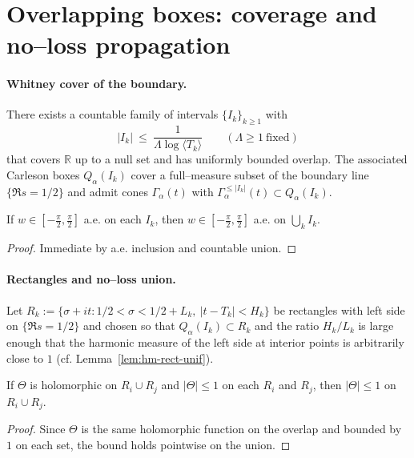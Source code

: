 
\section*{Overlapping boxes: coverage and no–loss propagation}

\paragraph{Whitney cover of the boundary.}
There exists a countable family of intervals $\{I_k\}_{k\ge1}$ with
\[|I_k|\ \le\ \frac{1}{\Lambda\log\langle T_k\rangle}\qquad(\Lambda\ge1\ \text{fixed})\]
that covers $\mathbb{R}$ up to a null set and has uniformly bounded overlap. The associated Carleson boxes $Q_\alpha(I_k)$ cover a full–measure subset of the boundary line $\{\Re s=1/2\}$ and admit cones $\Gamma_\alpha(t)$ with $\Gamma_\alpha^{\le |I_k|}(t)\subset Q_\alpha(I_k)$.

\begin{lemma}\label{lem:wedge-overlap}
If $w\in[-\tfrac{\pi}{2},\tfrac{\pi}{2}]$ a.e. on each $I_k$, then $w\in[-\tfrac{\pi}{2},\tfrac{\pi}{2}]$ a.e. on $\bigcup_k I_k$.
\end{lemma}

\begin{proof}
Immediate by a.e. inclusion and countable union.
\end{proof}

\paragraph{Rectangles and no–loss union.}
Let $R_k:=\{\sigma+it:1/2<\sigma<1/2+L_k,\ |t-T_k|<H_k\}$ be rectangles with left side on $\{\Re s=1/2\}$ and chosen so that $Q_\alpha(I_k)\subset R_k$ and the ratio $H_k/L_k$ is large enough that the harmonic measure of the left side at interior points is arbitrarily close to $1$ (cf. Lemma~\ref{lem:hm-rect-unif}).

\begin{lemma}\label{lem:union-rectangles}
If $\Theta$ is holomorphic on $R_i\cup R_j$ and $|\Theta|\le 1$ on each $R_i$ and $R_j$, then $|\Theta|\le1$ on $R_i\cup R_j$.
\end{lemma}

\begin{proof}
Since $\Theta$ is the same holomorphic function on the overlap and bounded by $1$ on each set, the bound holds pointwise on the union.
\end{proof}

